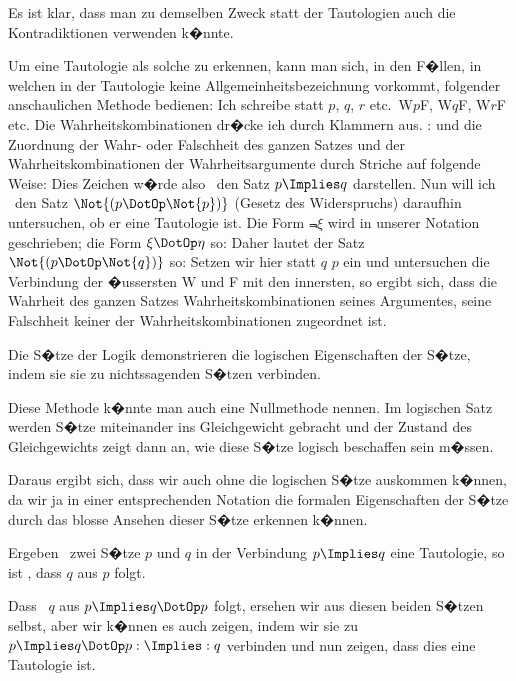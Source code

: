 {Es ist klar, dass man zu demselben Zweck statt
der Tautologien auch die Kontradiktionen verwenden
k�nnte.}


{{\verystretchyspace
Um eine Tautologie als solche zu erkennen,
kann man sich, in den F�llen, in welchen in der
Tautologie keine Allgemeinheitsbezeichnung vorkommt,
folgender anschaulichen Methode bedienen:
Ich schreibe statt \glqq{}$p$\grqq{}, \glqq{}$q$\grqq{}, \glqq{}$r$\grqq{} etc.\ \glqq{}W$p$F\grqq{},
\glqq{}W$q$F\grqq{}, \glqq{}W$r$F\grqq{} etc. Die Wahrheitskombinationen
dr�cke ich durch Klammern aus.
\zumBeispiel:}
und die Zuordnung der Wahr- oder Falschheit des
ganzen Satzes und der Wahrheitskombinationen
der Wahrheitsargumente durch Striche auf
folgende Weise:
Dies Zeichen w�rde also \zumBeispiel\ den Satz $p \Implies q$
darstellen. Nun will ich \zumBeispiel\ den Satz $\Not{(p \DotOp \Not{p})}$
(Gesetz des Widerspruchs) daraufhin untersuchen,
ob er eine Tautologie ist. Die Form \glqq{}$\Not{\xi}$\grqq{} wird
in unserer Notation
geschrieben; die Form \glqq{}$\xi \DotOp \eta$\grqq{} so:
Daher lautet der Satz $\Not{(p \DotOp \Not{q})}$ so:
Setzen wir hier statt \glqq{}$q$\grqq{} \glqq{}$p$\grqq{} ein und untersuchen
die Verbindung der �ussersten W und F mit den
innersten, so ergibt sich, dass die Wahrheit des
ganzen Satzes  Wahrheitskombinationen
seines Argumentes, seine Falschheit keiner der
Wahrheitskombinationen zugeordnet ist.}


{Die S�tze der Logik demonstrieren die logischen
Eigenschaften der S�tze, indem sie sie zu nichtssagenden
S�tzen verbinden.

Diese Methode k�nnte man auch eine Nullmethode
nennen. Im logischen Satz werden S�tze
miteinander ins Gleichgewicht gebracht und der
Zustand des Gleichgewichts zeigt dann an, wie
diese S�tze logisch beschaffen sein m�ssen.}


{Daraus ergibt sich, dass wir auch ohne die
logischen S�tze auskommen k�nnen, da wir ja in
einer entsprechenden Notation die formalen Eigenschaften
der S�tze durch das blosse Ansehen dieser
S�tze erkennen k�nnen.}


{Ergeben \zumBeispiel\ zwei S�tze \glqq{}$p$\grqq{} und \glqq{}$q$\grqq{} in der
Verbindung \glqq{}$p \Implies q$\grqq{} eine Tautologie, so ist ,
dass $q$ aus $p$ folgt.

Dass \zumBeispiel\ \glqq{}$q$\grqq{} aus \glqq{}$p \Implies q \DotOp p$\grqq{} folgt, ersehen wir
aus diesen beiden S�tzen selbst, aber wir k�nnen
es auch  zeigen, indem wir sie zu \glqq{}$p \Implies q \DotOp p : \Implies : q$\grqq{}
verbinden und nun zeigen, dass dies eine Tautologie
ist.}


